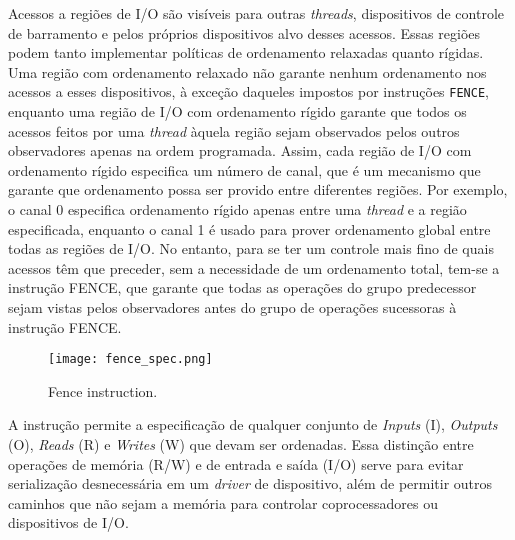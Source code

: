 		Acessos a regiões de I/O são visíveis para outras \textit{threads}, dispositivos de controle
		de barramento e pelos próprios dispositivos alvo desses acessos. Essas regiões podem tanto
		implementar políticas de ordenamento relaxadas quanto rígidas. Uma região com ordenamento
		relaxado não garante nenhum ordenamento nos acessos a esses dispositivos, à exceção daqueles
		impostos por instruções \texttt{FENCE}, enquanto uma região de I/O com ordenamento
		rígido garante que todos os acessos feitos por uma \textit{thread} àquela região sejam observados
		pelos outros observadores apenas na ordem programada. Assim, cada região de I/O com ordenamento
		rígido especifica um número de canal, que é um mecanismo que garante que ordenamento possa
		ser provido entre diferentes regiões. Por exemplo, o canal 0 especifica ordenamento rígido
		apenas entre uma \textit{thread} e a região especificada, enquanto o canal 1 é usado para prover
		ordenamento global entre todas as regiões de I/O. No entanto, para se ter um controle mais
		fino de quais acessos têm que preceder, sem a necessidade de um ordenamento total, tem-se
		a instrução FENCE, que garante que todas as operações do grupo predecessor sejam vistas
		pelos observadores antes do grupo de operações sucessoras à instrução FENCE.

		\begin{figure}[t]
			\centering
			\texttt{[image: fence\_spec.png]}
			\caption{Fence instruction.}
		\end{figure}

		A instrução permite a especificação de qualquer conjunto de \textit{Inputs} (I),
		\textit{Outputs} (O), \textit{Reads} (R) e \textit{Writes} (W) que devam ser
		ordenadas. Essa distinção entre operações de memória (R/W) e de entrada e saída (I/O)
		serve para evitar serialização desnecessária em um \textit{driver} de dispositivo, além
		de permitir outros caminhos que não sejam a memória para controlar coprocessadores ou
		dispositivos de I/O.


